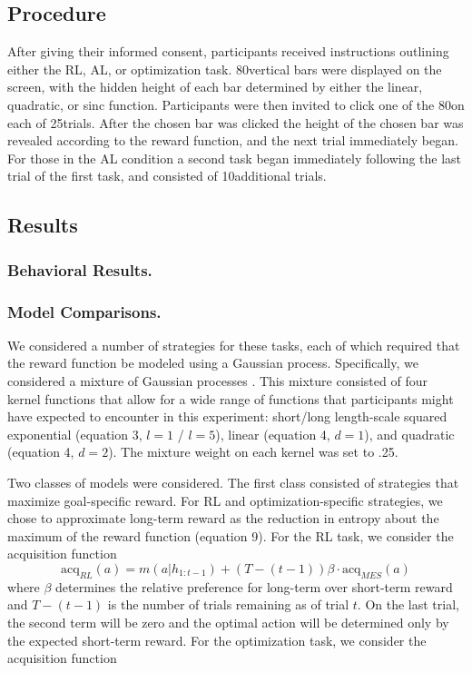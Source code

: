 \documentclass[10pt,letterpaper]{article}
\def\numtrials{25}
\def\numtrialsminerror{10}
\def\numbars{80}
\begin{document}
	\subsection{Procedure}
	
	After giving their informed consent, participants received instructions outlining either the RL, AL, or optimization task. \numbars \space vertical bars were displayed on the screen, with the hidden height of each bar determined by either the linear, quadratic, or sinc function. Participants were then invited to click one of the \numbars \space on each of \numtrials \space trials. After the chosen bar was clicked the height of the chosen bar was revealed according to the reward function, and the next trial immediately began. For those in the AL condition a second task began immediately following the last trial of the first task, and consisted of \numtrialsminerror \space additional trials.
	
	\subsection{Results}
	
	\subsubsection{Behavioral Results.}
	
	\subsubsection{Model Comparisons.}
	
	We considered a number of strategies for these tasks, each of which required that the reward function be modeled using a Gaussian process. Specifically, we considered a mixture of Gaussian processes \citep{Tresp}. This mixture consisted of four kernel functions that allow for a wide range of functions that participants might have expected to encounter in this experiment: short/long length-scale squared exponential (equation 3, $l = 1$ / $l = 5$), linear (equation 4, $d = 1$), and quadratic (equation 4, $d = 2$). The mixture weight on each kernel was set to .25.
	
	Two classes of models were considered. The first class consisted of strategies that maximize goal-specific reward. For RL and optimization-specific strategies, we chose to approximate long-term reward as the reduction in entropy about the maximum of the reward function (equation 9). For the RL task, we consider the acquisition function
	\begin{equation}
	\text{acq}_{RL}(a)  = m(a|h_{1:t-1}) + (T-(t-1))\beta \cdot \text{acq}_{MES}(a)
	\end{equation}
	where $\beta$ determines the relative preference for long-term over short-term reward and $T-(t-1)$ is the number of trials remaining as of trial $t$. On the last trial, the second term will be zero and the optimal action will be determined only by the expected short-term reward. For the optimization task, we consider the acquisition function
\end{document}
